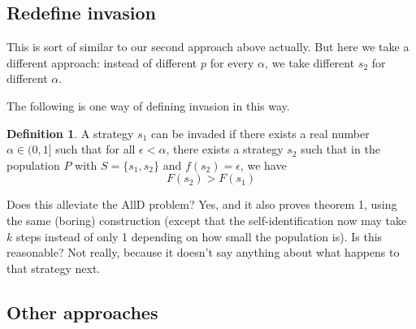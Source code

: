 \documentclass[11pt]{amsart}
\theoremstyle{definition}
\newtheorem{definition}{Definition}
\theoremstyle{remark}
\begin{document}
\subsection*{Redefine invasion}

This is sort of similar to our second approach above actually. But here we take a different approach: instead of different $p$ for every $\alpha$, we take different $s_2$ for different $\alpha$. 

The following is one way of defining invasion in this way.
\begin{definition}
  A strategy $s_1$ can be invaded if there exists a real number $\alpha \in (0,1]$ such that for all $\epsilon < \alpha$, there exists a strategy $s_2$ such that in the population $P$ with $S = \{s_1,s_2\}$ and $f(s_2) = \epsilon$, we have \begin{equation*}
    F(s_2) > F(s_1)
  \end{equation*}
\end{definition}

Does this alleviate the AllD problem? Yes, and it also proves theorem 1, using the same (boring) construction (except that the self-identification now may take $k$ steps instead of only 1 depending on how small the population is). Is this reasonable? Not really, because it doesn't say anything about what happens to that strategy next.


\subsection*{Other approaches}
\end{document}
